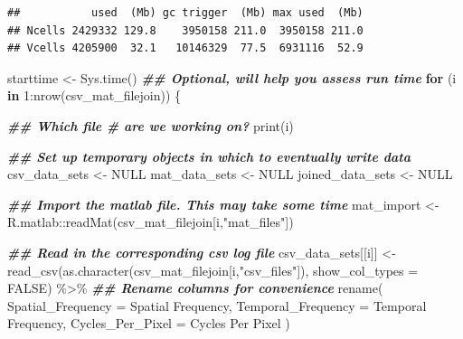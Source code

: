 \documentclass[
]{book}
\newenvironment{Shaded}{\begin{snugshade}}{\end{snugshade}}
\newcommand{\AttributeTok}[1]{\textcolor[rgb]{0.77,0.63,0.00}{#1}}
\newcommand{\ConstantTok}[1]{\textcolor[rgb]{0.00,0.00,0.00}{#1}}
\newcommand{\ControlFlowTok}[1]{\textcolor[rgb]{0.13,0.29,0.53}{\textbf{#1}}}
\newcommand{\DecValTok}[1]{\textcolor[rgb]{0.00,0.00,0.81}{#1}}
\newcommand{\DocumentationTok}[1]{\textcolor[rgb]{0.56,0.35,0.01}{\textbf{\textit{#1}}}}
\newcommand{\FunctionTok}[1]{\textcolor[rgb]{0.00,0.00,0.00}{#1}}
\newcommand{\NormalTok}[1]{#1}
\newcommand{\OtherTok}[1]{\textcolor[rgb]{0.56,0.35,0.01}{#1}}
\newcommand{\SpecialCharTok}[1]{\textcolor[rgb]{0.00,0.00,0.00}{#1}}
\newcommand{\StringTok}[1]{\textcolor[rgb]{0.31,0.60,0.02}{#1}}
\begin{document}
\begin{verbatim}
##           used  (Mb) gc trigger  (Mb) max used  (Mb)
## Ncells 2429332 129.8    3950158 211.0  3950158 211.0
## Vcells 4205900  32.1   10146329  77.5  6931116  52.9
\end{verbatim}

\begin{Shaded}
\begin{Highlighting}[]
\NormalTok{starttime }\OtherTok{\textless{}{-}} \FunctionTok{Sys.time}\NormalTok{() }\DocumentationTok{\#\# Optional, will help you assess run time}
\ControlFlowTok{for}\NormalTok{ (i }\ControlFlowTok{in} \DecValTok{1}\SpecialCharTok{:}\FunctionTok{nrow}\NormalTok{(csv\_mat\_filejoin)) \{}

  \DocumentationTok{\#\# Which file \# are we working on?}
  \FunctionTok{print}\NormalTok{(i)}

  \DocumentationTok{\#\# Set up temporary objects in which to eventually write data}
\NormalTok{  csv\_data\_sets }\OtherTok{\textless{}{-}} \ConstantTok{NULL}
\NormalTok{  mat\_data\_sets }\OtherTok{\textless{}{-}} \ConstantTok{NULL}
\NormalTok{  joined\_data\_sets }\OtherTok{\textless{}{-}} \ConstantTok{NULL}

  \DocumentationTok{\#\# Import the matlab file. This may take some time}
\NormalTok{  mat\_import }\OtherTok{\textless{}{-}}
\NormalTok{    R.matlab}\SpecialCharTok{::}\FunctionTok{readMat}\NormalTok{(csv\_mat\_filejoin[i,}\StringTok{"mat\_files"}\NormalTok{])}

  \DocumentationTok{\#\# Read in the corresponding csv log file}
\NormalTok{  csv\_data\_sets[[i]] }\OtherTok{\textless{}{-}}
    \FunctionTok{read\_csv}\NormalTok{(}\FunctionTok{as.character}\NormalTok{(csv\_mat\_filejoin[i,}\StringTok{"csv\_files"}\NormalTok{]),}
             \AttributeTok{show\_col\_types =} \ConstantTok{FALSE}\NormalTok{) }\SpecialCharTok{\%\textgreater{}\%}
    \DocumentationTok{\#\# Rename columns for convenience}
    \FunctionTok{rename}\NormalTok{(}
      \AttributeTok{Spatial\_Frequency =} \StringTok{\textasciigrave{}}\AttributeTok{Spatial Frequency}\StringTok{\textasciigrave{}}\NormalTok{,}
      \AttributeTok{Temporal\_Frequency =} \StringTok{\textasciigrave{}}\AttributeTok{Temporal Frequency}\StringTok{\textasciigrave{}}\NormalTok{,}
      \AttributeTok{Cycles\_Per\_Pixel =} \StringTok{\textasciigrave{}}\AttributeTok{Cycles Per Pixel}\StringTok{\textasciigrave{}}
\NormalTok{    )}


\end{Highlighting}
\end{Shaded}
\end{document}
